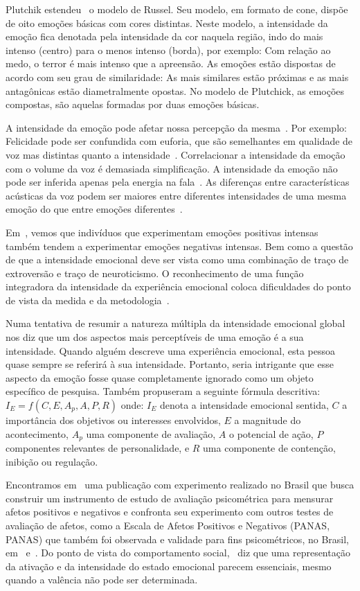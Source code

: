 Plutchik estendeu~\cite{57} o modelo de Russel. Seu modelo, em formato de cone, dispõe de oito emoções básicas com cores distintas. Neste modelo, a intensidade da emoção fica denotada pela intensidade da cor naquela região, indo do mais intenso (centro) para o menos intenso (borda), por exemplo: Com relação ao medo, o terror é mais intenso que a apreensão. As emoções estão dispostas de acordo com seu grau de similaridade: As mais similares estão próximas e as mais antagônicas estão diametralmente opostas. No modelo de Plutchick, as emoções compostas, são aquelas formadas por duas emoções básicas.

A intensidade da emoção pode afetar nossa percepção da mesma~\cite{18.46}. Por exemplo: Felicidade pode ser confundida com euforia, que são semelhantes em qualidade de voz mas distintas quanto a intensidade~\cite{18.9}. Correlacionar a intensidade da emoção com o volume da voz é demasiada simplificação. A intensidade da emoção não pode ser inferida apenas pela energia na fala~\cite{18.12}. As diferenças entre características acústicas da voz podem ser maiores entre diferentes intensidades de uma mesma emoção do que entre emoções diferentes~\cite{18.46}. 

Em~\cite{emoint1}, vemos que indivíduos que experimentam emoções positivas intensas também tendem a experimentar emoções negativas intensas. Bem como a questão de que a intensidade emocional deve ser vista como uma combinação de traço de extroversão e traço de neuroticismo. O reconhecimento de uma função integradora da intensidade da experiência emocional coloca dificuldades do ponto de vista da medida e da metodologia~\cite{emoint2}.

Numa tentativa de resumir a natureza múltipla da intensidade emocional global~\cite{emoint2.1} nos diz que um dos aspectos mais perceptíveis de uma emoção é a sua intensidade. Quando alguém descreve uma experiência emocional, esta pessoa quase sempre se referirá à sua intensidade. Portanto, seria intrigante que esse aspecto da emoção fosse quase completamente ignorado como um objeto específico de pesquisa. Também propuseram a seguinte fórmula descritiva: $I_E = f(C, E, A_p, A, P, R)$ onde: $I_E$ denota a intensidade emocional sentida, $C$ a importância dos objetivos ou interesses envolvidos, $E$ a magnitude do acontecimento, $A_p$ uma componente de avaliação, $A$ o potencial de ação, $P$ componentes relevantes de personalidade, e $R$ uma componente de contenção, inibição ou regulação.

Encontramos em~\cite{emoint3} uma publicação com experimento realizado no Brasil que busca construir um instrumento de estudo de avaliação psicométrica para mensurar afetos positivos e negativos e confronta seu experimento com outros testes de avaliação de afetos, como a Escala de Afetos Positivos e Negativos (\acrlong{PANAS}, \acrshort{PANAS}) que também foi observada e validade para fins psicométricos, no Brasil, em~\cite{panas1} e~\cite{panas2}. Do ponto de vista do comportamento social,~\cite{16} diz que uma representação da ativação e da intensidade do estado emocional parecem essenciais, mesmo quando a valência não pode ser determinada.

